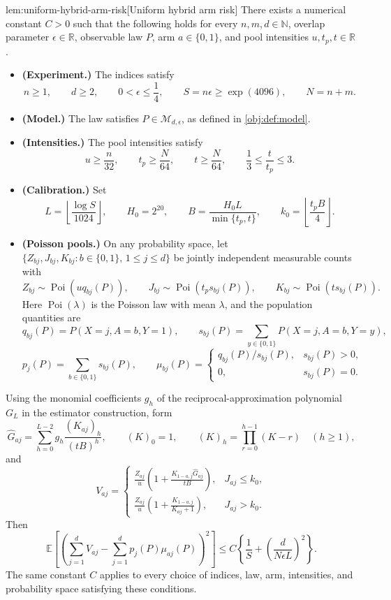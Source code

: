 \documentclass[11pt]{article}
\begin{document}
\begin{lemmav}{lem:uniform-hybrid-arm-risk}[Uniform hybrid arm risk]
There exists a numerical constant \(C>0\) such that the following holds for every \(n,m,d\in\mathbb N\), overlap parameter \(\epsilon\in\mathbb R\), observable law \(P\), arm \(a\in\{0,1\}\), and pool intensities \(u,t_p,t\in\mathbb R\).
\begin{itemize}
\item \textbf{(Experiment.)} The indices satisfy
\[
n\ge1,\qquad d\ge2,\qquad 0<\epsilon\le\frac14,\qquad
S=n\epsilon\ge\exp(4096),\qquad N=n+m.
\]
\item \textbf{(Model.)} The law satisfies \(P\in\mathcal M_{d,\epsilon}\), as defined in \cref{obj:def:model}.
\item \textbf{(Intensities.)} The pool intensities satisfy
\[
u\ge\frac n{32},\qquad t_p\ge\frac N{64},\qquad
t\ge\frac N{64},\qquad \frac13\le\frac t{t_p}\le3.
\]
\item \textbf{(Calibration.)} Set
\[
L=\left\lfloor\frac{\log S}{1024}\right\rfloor,\qquad
H_0=2^{20},\qquad B=\frac{H_0L}{\min\{t_p,t\}},\qquad
k_0=\left\lfloor\frac{t_pB}{4}\right\rfloor.
\]
\item \textbf{(Poisson pools.)} On any probability space, let
\(\{Z_{bj},J_{bj},K_{bj}:b\in\{0,1\},\,1\le j\le d\}\)
be jointly independent measurable counts with
\[
Z_{bj}\sim\operatorname{Poi}\!\left(uq_{bj}(P)\right),\qquad
J_{bj}\sim\operatorname{Poi}\!\left(t_ps_{bj}(P)\right),\qquad
K_{bj}\sim\operatorname{Poi}\!\left(ts_{bj}(P)\right).
\]
Here \(\operatorname{Poi}(\lambda)\) is the Poisson law with mean \(\lambda\), and the population quantities are
\[
q_{bj}(P)=P(X=j,A=b,Y=1),\qquad
s_{bj}(P)=\sum_{y\in\{0,1\}}P(X=j,A=b,Y=y),
\]
\[
p_j(P)=\sum_{b\in\{0,1\}}s_{bj}(P),\qquad
\mu_{bj}(P)=
\begin{cases}
q_{bj}(P)/s_{bj}(P),&s_{bj}(P)>0,\\
0,&s_{bj}(P)=0.
\end{cases}
\]
\end{itemize}
Using the monomial coefficients \(g_h\) of the reciprocal-approximation polynomial \(G_L\) in the estimator construction, form
\[
\widehat G_{aj}
=\sum_{h=0}^{L-2}g_h\frac{(K_{aj})_h}{(tB)^h},
\qquad
(K)_0=1,\qquad
(K)_h=\prod_{r=0}^{h-1}(K-r)\quad(h\ge1),
\]
and
\[
V_{aj}=
\begin{cases}
\displaystyle
\frac{Z_{aj}}u
\left(1+\frac{K_{1-a,j}\widehat G_{aj}}{tB}\right),
&J_{aj}\le k_0,\\[6pt]
\displaystyle
\frac{Z_{aj}}u
\left(1+\frac{K_{1-a,j}}{K_{aj}+1}\right),
&J_{aj}>k_0.
\end{cases}
\]
Then
\[
\mathbb E\!\left[
\left(\sum_{j=1}^dV_{aj}
-\sum_{j=1}^dp_j(P)\mu_{aj}(P)\right)^2
\right]
\le
C\left\{\frac1S+
\left(\frac d{N\epsilon L}\right)^2\right\}.
\]
The same constant \(C\) applies to every choice of indices, law, arm, intensities, and probability space satisfying these conditions.
\end{lemmav}
\end{document}
